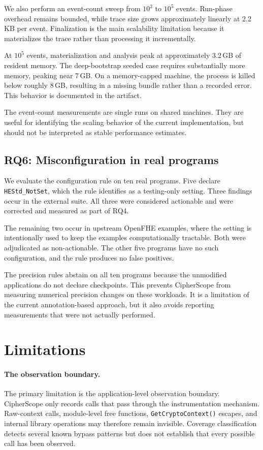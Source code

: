\documentclass[sigconf,nonacm]{acmart}
\begin{document}
We also perform an event-count sweep from $10^2$ to $10^5$ events. Run-phase
overhead remains bounded, while trace size grows approximately linearly at
2.2\,KB per event. Finalization is the main scalability limitation because it
materializes the trace rather than processing it incrementally.

At $10^5$ events, materialization and analysis peak at approximately
3.2\,GB of resident memory. The deep-bootstrap seeded case requires
substantially more memory, peaking near 7\,GB. On a memory-capped machine,
the process is killed below roughly 8\,GB, resulting in a missing bundle
rather than a recorded error. This behavior is documented in the artifact.

The event-count measurements are single runs on shared machines. They are
useful for identifying the scaling behavior of the current implementation,
but should not be interpreted as stable performance estimates.

\subsection{RQ6: Misconfiguration in real programs}
\label{sec:rq6}

We evaluate the configuration rule on ten real programs. Five declare
\texttt{HEStd\_NotSet}, which the rule identifies as a testing-only setting.
Three findings occur in the external suite. All three were considered
actionable and were corrected and measured as part of RQ4.

The remaining two occur in upstream OpenFHE examples, where the setting is
intentionally used to keep the examples computationally tractable. Both were
adjudicated as non-actionable. The other five programs have no such
configuration, and the rule produces no false positives.

The precision rules abstain on all ten programs because the unmodified
applications do not declare checkpoints. This prevents CipherScope from
measuring numerical precision changes on these workloads. It is a limitation
of the current annotation-based approach, but it also avoids reporting
measurements that were not actually performed.

\section{Limitations}
\label{sec:limits}

\paragraph{The observation boundary.} The primary limitation is the
application-level observation boundary. CipherScope only records calls that
pass through the instrumentation mechanism. Raw-context calls, module-level
free functions, \texttt{GetCryptoContext()} escapes, and internal library
operations may therefore remain invisible. Coverage classification detects
several known bypass patterns but does not establish that every possible call
has been observed.
\end{document}
